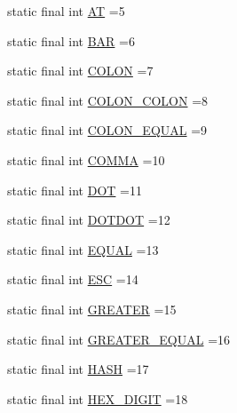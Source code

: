 \begin{DoxyCompactItemize}
static final int \hyperlink{classorg_1_1tzi_1_1use_1_1parser_1_1generator_1_1_generator_lexer_ab27a4c03192c67674d70fc386ffa6c06}{A\-T} =5
\item 
static final int \hyperlink{classorg_1_1tzi_1_1use_1_1parser_1_1generator_1_1_generator_lexer_a3717ebbeaf217c9621a26cffd9cff471}{B\-A\-R} =6
\item 
static final int \hyperlink{classorg_1_1tzi_1_1use_1_1parser_1_1generator_1_1_generator_lexer_ad4bdfd7054b9536aa9fda9fbc6e911c9}{C\-O\-L\-O\-N} =7
\item 
static final int \hyperlink{classorg_1_1tzi_1_1use_1_1parser_1_1generator_1_1_generator_lexer_a05cf65f7ac27f84a064c39eba1d6b30d}{C\-O\-L\-O\-N\-\_\-\-C\-O\-L\-O\-N} =8
\item 
static final int \hyperlink{classorg_1_1tzi_1_1use_1_1parser_1_1generator_1_1_generator_lexer_a5de08262e6f84a31b8c6d8d342e247ea}{C\-O\-L\-O\-N\-\_\-\-E\-Q\-U\-A\-L} =9
\item 
static final int \hyperlink{classorg_1_1tzi_1_1use_1_1parser_1_1generator_1_1_generator_lexer_aa65242ff4fc46ad6894974b8b9f8b23a}{C\-O\-M\-M\-A} =10
\item 
static final int \hyperlink{classorg_1_1tzi_1_1use_1_1parser_1_1generator_1_1_generator_lexer_ac205610a60c588090b881318c35c5620}{D\-O\-T} =11
\item 
static final int \hyperlink{classorg_1_1tzi_1_1use_1_1parser_1_1generator_1_1_generator_lexer_a245f817a6a4ce681826352e38fc462bf}{D\-O\-T\-D\-O\-T} =12
\item 
static final int \hyperlink{classorg_1_1tzi_1_1use_1_1parser_1_1generator_1_1_generator_lexer_a21cdb02acedd830b7dcc72b62930f5c5}{E\-Q\-U\-A\-L} =13
\item 
static final int \hyperlink{classorg_1_1tzi_1_1use_1_1parser_1_1generator_1_1_generator_lexer_a0cd6eaf32bc72fdb3746096ceef29382}{E\-S\-C} =14
\item 
static final int \hyperlink{classorg_1_1tzi_1_1use_1_1parser_1_1generator_1_1_generator_lexer_ac025ea909e87d485eb348c1b66e8204e}{G\-R\-E\-A\-T\-E\-R} =15
\item 
static final int \hyperlink{classorg_1_1tzi_1_1use_1_1parser_1_1generator_1_1_generator_lexer_a0444c8a8633d7c826329446819d588bd}{G\-R\-E\-A\-T\-E\-R\-\_\-\-E\-Q\-U\-A\-L} =16
\item 
static final int \hyperlink{classorg_1_1tzi_1_1use_1_1parser_1_1generator_1_1_generator_lexer_a76c36378aa52cdfd3396cd191a38c12f}{H\-A\-S\-H} =17
\item 
static final int \hyperlink{classorg_1_1tzi_1_1use_1_1parser_1_1generator_1_1_generator_lexer_a6c15ee6845c6fe8ca453982480e18545}{H\-E\-X\-\_\-\-D\-I\-G\-I\-T} =18

\end{DoxyCompactItemize}
